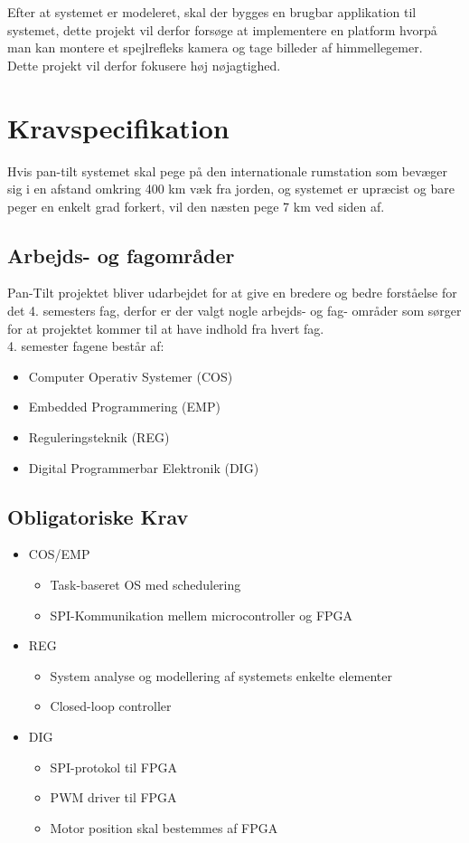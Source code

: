 Efter at systemet er modeleret, skal der bygges en brugbar applikation til systemet, dette projekt vil derfor forsøge at implementere en platform hvorpå man kan montere et spejlrefleks kamera og tage billeder af himmellegemer.\\
Dette projekt vil derfor fokusere høj nøjagtighed.\\

\section{Kravspecifikation}

Hvis pan-tilt systemet skal pege på den internationale rumstation som bevæger sig i en afstand omkring 400 km væk fra jorden, og systemet er upræcist og bare peger en enkelt grad forkert, vil den næsten pege 7 km ved siden af.

\subsection{Arbejds- og fagområder}
Pan-Tilt projektet bliver udarbejdet for at give en bredere og bedre forståelse for det 4. semesters fag, derfor er der valgt nogle arbejds- og fag- områder som sørger for at projektet kommer til at have indhold fra hvert fag.\\
4. semester fagene består af:
\begin{itemize}[noitemsep]
	\item Computer Operativ Systemer (COS)
	\item Embedded Programmering (EMP)
	\item Reguleringsteknik (REG)
	\item Digital Programmerbar Elektronik (DIG)
\end{itemize}

\subsection{Obligatoriske Krav}

\begin{itemize}[noitemsep]
	\item COS/EMP
	\begin{itemize}[noitemsep]
		\item Task-baseret OS med schedulering
		\item SPI-Kommunikation mellem microcontroller og FPGA
	\end{itemize}
	\item REG
	\begin{itemize}[noitemsep]
		\item System analyse og modellering af systemets enkelte elementer
		\item Closed-loop controller
	\end{itemize}
	\item DIG
	\begin{itemize}[noitemsep]
		\item SPI-protokol til FPGA
		\item PWM driver til FPGA
		\item Motor position skal bestemmes af FPGA
	\end{itemize}
\end{itemize}

